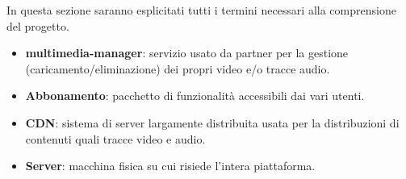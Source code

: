  In questa sezione saranno esplicitati tutti i termini necessari alla comprensione del progetto.

\begin{itemize}
	\item  \textbf{multimedia-manager}: servizio usato da partner per la gestione (caricamento/eliminazione) dei propri video e/o tracce audio.
	\item \textbf{Abbonamento}: pacchetto di funzionalità accessibili dai vari utenti.
	\item \textbf{CDN}: sistema di server largamente distribuita usata per la distribuzioni di contenuti quali tracce video e audio.
	\item \textbf{Server}: macchina fisica su cui risiede l'intera piattaforma.
\end{itemize}